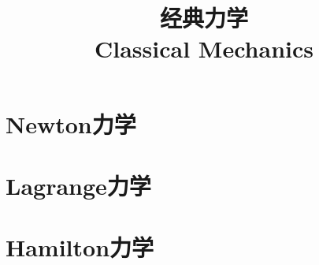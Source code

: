 \documentclass{../thunote}
\begin{document}
\title{经典力学\\Classical Mechanics}
\maketitle

\frontmatter
\tableofcontents

\mainmatter
\part{Newton力学}


\part{Lagrange力学}

\part{Hamilton力学}
\end{document}
